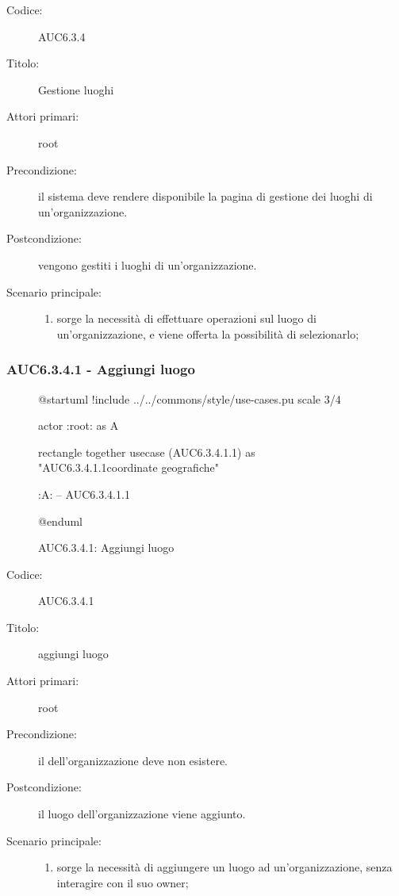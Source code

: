 \documentclass[casi-duso]{subfiles}
\begin{document}
\begin{description}
  \item[Codice:] AUC6.3.4
  \item[Titolo:] Gestione luoghi
  \item[Attori primari:] root
  \item[Precondizione:] il sistema deve rendere disponibile la pagina di gestione dei luoghi di un'organizzazione.
  \item[Postcondizione:] vengono gestiti i luoghi di un'organizzazione.
  \item[Scenario principale:]
  \begin{enumerate}
    \item sorge la necessità di effettuare operazioni sul luogo di un'organizzazione, e viene offerta la possibilità di selezionarlo;
  \end{enumerate}
\end{description}

\subsubsection{AUC6.3.4.1 - Aggiungi luogo}%
\label{subsub:AUC6.3.4.1}

\begin{figure}[h!]
  \centering
  \begin{plantuml}
  @startuml
  !include ../../commons/style/use-cases.pu
  scale 3/4

  actor :root: as A

  rectangle {
    together {
      usecase (AUC6.3.4.1.1) as "AUC6.3.4.1.1\nInserisci coordinate geografiche"
    }
  }

  :A: -- AUC6.3.4.1.1

  @enduml
  \end{plantuml}
  \caption{AUC6.3.4.1: Aggiungi luogo}
  \label{fig:auc6_3_4_1}
\end{figure}

\begin{description}
  \item[Codice:] AUC6.3.4.1
  \item[Titolo:] aggiungi luogo
  \item[Attori primari:] root
  \item[Precondizione:] il  dell'organizzazione deve non esistere.
  \item[Postcondizione:] il luogo dell'organizzazione viene aggiunto.
  \item[Scenario principale:]
  \begin{enumerate}
    \item sorge la necessità di aggiungere un luogo ad un'organizzazione, senza interagire con il suo owner;
  \end{enumerate}
\end{description}
\end{document}
